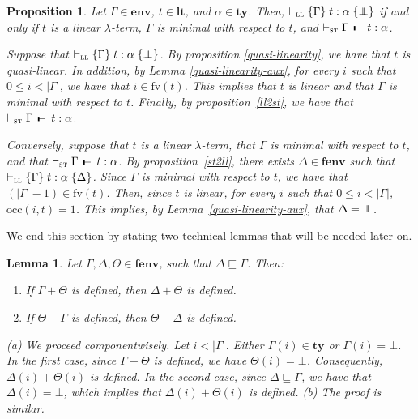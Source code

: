 \documentclass[submission,creativecommons]{eptcs}
\newtheorem{lemma}{Lemma}
\newtheorem{proposition}{Proposition}
\newcommand{\mybox}{\raisebox{3.5pt}{\framebox[7pt]{\rule{0mm}{0.3pt}}}}
\def\qed{\ifmmode\mybox\else{\unskip\nobreak\hfil
\penalty50\hskip1em\null\nobreak\hfil\mybox
\parfillskip=0pt\finalhyphendemerits=0\endgraf}\fi}
\newenvironment{proof}{%

\vspace{.7ex}
\noindent{\it Proof.} \rm}{\qed}
\def\joinrelm{\mathrel{\mkern-3mu}}
\def\relbar{\mathrel{\smash-}}
\def\tailpiece{\mathchoice
  {\vrule height 1ex width 0.3ex depth -.1ex}%
  {\vrule height 1ex width 0.3ex depth -.1ex}%
  {\vrule height 0.7ex width 0.3ex depth -.1ex}%
  {\vrule height 0.7ex width 0.3ex depth -.1ex}}
\def\seqsym{\mathrel{\tailpiece\joinrelm\relbar}}
\newcommand{\bt}{{\scriptstyle\bot}}
\newcommand{\tseq}[3]{#1 \, \seqsym \, #2 : #3}
\newcommand{\tytm}[4]{\{#1\}\;#2:#3\;\{#4\}}
\newcommand{\der}[1]{\vdash_{#1}}
\newcommand{\Sst}{{\textsc{st}}}
\newcommand{\Sll}{{\textsc{ll}}}
\newcommand{\ltm}{\mathord{\mathbf{lt}}}
\newcommand{\ty}{\mathord{\mathbf{ty}}}
\newcommand{\env}{\mathord{\mathbf{env}}}
\newcommand{\fenv}{\mathord{\mathbf{fenv}}}
\newcommand{\occ}[2]{\mathord{\mathrm{occ}}(#1,#2)}
\newcommand{\fv}[1]{\mathord{\mathrm{fv}}(#1)}
\newcommand{\minenv}{\mathord{\bot\hspace{-1.55ex}\bot}}
\begin{document}
\begin{proposition}
Let $\Gamma\in\env$, $t\in\ltm$, and $\alpha\in\ty$.
Then, $\der{\Sll}\tytm{\Gamma}{t}{\alpha}{\minenv}$ if and only if
$t$ is a linear $\lambda$-term, $\Gamma$ is minimal with respect to $t$, and $\der{\Sst} \tseq{\Gamma}{t}{\alpha}$.
\begin{proof}
Suppose that $\der{\Sll}\tytm{\Gamma}{t}{\alpha}{\minenv}$. By proposition \ref{quasi-linearity}, we have that $t$
is quasi-linear. In addition, by Lemma \ref{quasi-linearity-aux}, for every $i$ such that $0\leq i <|\Gamma|$, we have
that $i\in\fv{t}$. This implies that $t$ is linear and that $\Gamma$ is minimal with respect to $t$. Finally,
by proposition~\ref{ll2st}, we have that $\der{\Sst} \tseq{\Gamma}{t}{\alpha}$.

Conversely, suppose that $t$ is a linear $\lambda$-term, that $\Gamma$ is minimal with respect to $t$, and that
$\der{\Sst} \tseq{\Gamma}{t}{\alpha}$.
By proposition~\ref{st2ll}, there exists $\Delta\in\fenv$ such that $\der{\Sll}\tytm{\Gamma}{t}{\alpha}{\Delta}$.
Since $\Gamma$ is minimal with respect to $t$, we have that $(|\Gamma|-1)\in\fv{t}$. Then, since $t$ is linear, for every $i$
such that $0\leq i<|\Gamma|$, $\occ{i}{t} = 1$. This implies, by Lemma~\ref{quasi-linearity-aux}, that $\Delta=\minenv$.
\end{proof}
\end{proposition}

We end this section by stating two technical lemmas that will be needed later on.

\begin{lemma}\label{lemma:envdefined}
Let $\Gamma, \Delta, \Theta \in \fenv$, such that $\Delta \sqsubseteq \Gamma$. Then:
\begin{enumerate}[label={\rm (\alph*)}, labelsep*=2ex, itemsep=0pt]
  \item If\/ $\Gamma + \Theta$ is defined, then $\Delta + \Theta$ is defined. \label{envdefined:add}
  \item If\/ $\Theta - \Gamma$ is defined, then $\Theta - \Delta$ is defined. \label{envdefined:sub}
\end{enumerate}
\begin{proof}
(a)
We proceed componentwisely. Let $i<|\Gamma|$. Either $\Gamma(i)\in\ty$ or $\Gamma(i)=\bt$.
In the first case, since $\Gamma + \Theta$ is defined, we have $\Theta(i)=\bt$.
Consequently, $\Delta(i) + \Theta(i)$ is defined. In the second case, since $\Delta \sqsubseteq \Gamma$, we have that
$\Delta(i) = \bt$, which implies that $\Delta(i) + \Theta(i)$ is defined.
(b) The proof is similar.
\end{proof}
\end{lemma}
\end{document}
